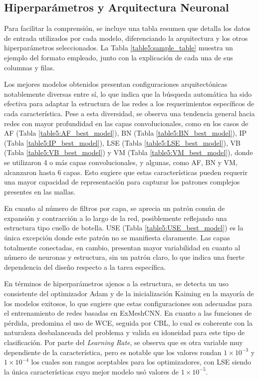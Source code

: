 \subsection{Hiperparámetros y Arquitectura Neuronal}
Para facilitar la comprensión, se incluye una tabla resumen que detalla los datos de entrada utilizados por cada modelo, diferenciando la arquitectura y los otros hiperparámetros seleccionados. La Tabla \ref{table5:sample_table} muestra un ejemplo del formato empleado, junto con la explicación de cada una de sus columnas y filas.

Los mejores modelos obtenidos presentan configuraciones arquitectónicas notablemente diversas entre sí, lo que indica que la búsqueda automática ha sido efectiva para adaptar la estructura de las redes a los requerimientos específicos de cada característica. Pese a esta diversidad, se observa una tendencia general hacia redes con mayor profundidad en las capas convolucionales, como en los casos de AF (Tabla \ref{table5:AF_best_model}), BN (Tabla \ref{table5:BN_best_model}), IP (Tabla \ref{table5:IP_best_model}), LSE (Tabla \ref{table5:LSE_best_model}), VB (Tabla \ref{table5:VB_best_model}) y VM (Tabla \ref{table5:VM_best_model}), donde se utilizaron 4 o más capas convolucionales, y algunas, como AF, BN y VM, alcanzaron hasta 6 capas. Esto sugiere que estas características pueden requerir una mayor capacidad de representación para capturar los patrones complejos presentes en las mallas.

En cuanto al número de filtros por capa, se aprecia un patrón común de expansión y contracción a lo largo de la red, posiblemente reflejando una estructura tipo cuello de botella. USE (Tabla \ref{table5:USE_best_model}) es la única excepción donde este patrón no se manifiesta claramente. Las capas totalmente conectadas, en cambio, presentan mayor variabilidad en cuanto al número de neuronas y estructura, sin un patrón claro, lo que indica una fuerte dependencia del diseño respecto a la tarea específica.

En términos de hiperparámetros ajenos a la estructura, se detecta un uso consistente del optimizador Adam y de la inicialización Kaiming en la mayoría de los modelos exitosos, lo que sugiere que estas configuraciones son adecuadas para el entrenamiento de redes basadas en ExMeshCNN. En cuanto a las funciones de pérdida, predomina el uso de WCE, seguida por CBL, lo cual es coherente con la naturaleza desbalanceada del problema y valida su idoneidad para este tipo de clasificación. Por parte del \textit{Learning Rate}, se observa que es otra variable muy dependiente de la característica, pero es notable que los valores rondan $1\times10^{-3}$ y $1\times10^{-4}$ los cuales son rangos aceptables para los optimizadores, con LSE siendo la única características cuyo mejor modelo usó valores de $1\times10^{-5}$. 

